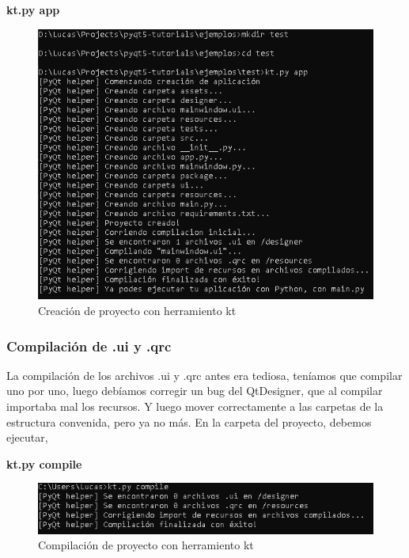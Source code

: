 \begin{center}
    \textbf{kt.py app}
\end{center}

\begin{figure}[H]
    \centering
    \includegraphics[width=0.9\linewidth]{imagenes/kt/app.png}
    \caption{Creaci\'on de proyecto con herramiento kt}
    \label{fig:creacion_app_kt}
\end{figure}

\subsubsection{Compilaci\'on de .ui y .qrc}
La compilaci\'on de los archivos .ui y .qrc antes era tediosa, ten\'iamos que compilar uno por uno, luego deb\'iamos
corregir un bug del QtDesigner, que al compilar importaba mal los recursos. Y luego mover correctamente a las carpetas de la estructura convenida,
pero ya no m\'as. En la carpeta del proyecto, debemos ejecutar,

\begin{center}
    \textbf{kt.py compile}
\end{center}

\begin{figure}[H]
    \centering
    \includegraphics[width=0.9\linewidth]{imagenes/kt/compile.png}
    \caption{Compilaci\'on de proyecto con herramiento kt}
    \label{fig:compilacion_kt}
\end{figure}

